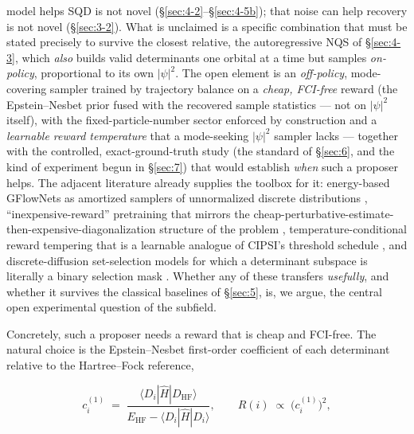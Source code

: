\documentclass[onecolumn,a4paper]{quantumarticle}
\begin{document}
model helps SQD is not novel (\S\ref{sec:4-2}--\S\ref{sec:4-5b}); that noise can help recovery is not novel (\S\ref{sec:3-2}). What is unclaimed is a specific combination that must be stated precisely to survive the closest relative, the autoregressive NQS of \S\ref{sec:4-3}, which \emph{also} builds valid determinants one orbital at a time but samples \emph{on-policy}, proportional to its own $|\psi|^2$. The open element is an \emph{off-policy}, mode-covering sampler trained by trajectory balance on a \emph{cheap, FCI-free} reward (the Epstein--Nesbet prior fused with the recovered sample statistics --- not on $|\psi|^2$ itself), with the fixed-particle-number sector enforced by construction and a \emph{learnable reward temperature} that a mode-seeking $|\psi|^2$ sampler lacks --- together with the controlled, exact-ground-truth study (the standard of \S\ref{sec:6}, and the kind of experiment begun in \S\ref{sec:7}) that would establish \emph{when} such a proposer helps. The adjacent literature already supplies the toolbox for it: energy-based GFlowNets as amortized samplers of unnormalized discrete distributions \cite{zhangd2022}, ``inexpensive-reward'' pretraining that mirrors the cheap-perturbative-estimate-then-expensive-diagonalization structure of the problem \cite{pandey2024}, temperature-conditional reward tempering that is a learnable analogue of CIPSI's threshold schedule \cite{kim2024}, and discrete-diffusion set-selection models for which a determinant subspace is literally a binary selection mask \cite{sun2023}. Whether any of these transfers \emph{usefully}, and whether it survives the classical baselines of \S\ref{sec:5}, is, we argue, the central open experimental question of the subfield.

Concretely, such a proposer needs a reward that is cheap and FCI-free. The natural choice is the Epstein--Nesbet first-order coefficient of each determinant relative to the Hartree--Fock reference,

\begin{equation}
c^{(1)}_i \;=\; \frac{\langle D_i|\hat H|D_{\mathrm{HF}}\rangle}{E_{\mathrm{HF}} - \langle D_i|\hat H|D_i\rangle}, \qquad R(i) \;\propto\; \big(c^{(1)}_i\big)^2,
\end{equation}
\end{document}
